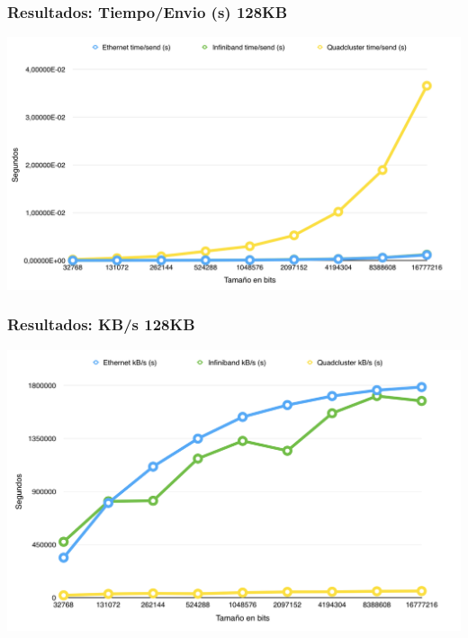 \documentclass[10pt]{beamer}
\begin{document}
\begin{frame}[fragile]
\frametitle{Resultados: Tiempo/Envio (s) 128KB}
\begin{center}
\includegraphics[scale=0.42]{5.png}
\end{center}
\end{frame}
\begin{frame}[fragile]
\frametitle{Resultados: KB/s 128KB}
\begin{center}
\includegraphics[scale=0.42]{6.png}
\end{center}
\end{frame}
\end{document}
